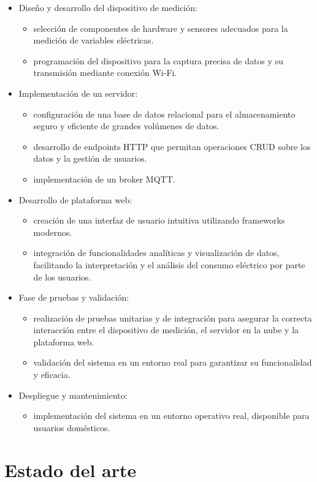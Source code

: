 \begin{itemize}
	\item Diseño y desarrollo del dispositivo de medición:
		\begin{itemize}
		\item selección de componentes de hardware y sensores adecuados para la medición de variables eléctricas.
		\item programación del dispositivo para la captura precisa de datos y su transmisión mediante conexión Wi-Fi.
		\end{itemize}
	\item Implementación de un servidor:
		\begin{itemize}
		\item configuración de una base de datos relacional para el almacenamiento seguro y eficiente de grandes volúmenes de datos.
		\item desarrollo de endpoints HTTP que permitan operaciones CRUD sobre los datos y la gestión de usuarios.
		\item implementación de un broker MQTT.
		\end{itemize}
	\item Desarrollo de plataforma web:
	\begin{itemize}
		\item creación de una interfaz de usuario intuitiva utilizando frameworks modernos.
		\item integración de funcionalidades analíticas y visualización de datos, facilitando la interpretación y el análisis del consumo eléctrico por parte de los usuarios.
	\end{itemize}
	\item Fase de pruebas y validación:
	\begin{itemize}
		\item realización de pruebas unitarias y de integración para asegurar la correcta interacción entre el dispositivo de medición, el servidor en la nube y la plataforma web.
		\item validación del sistema en un entorno real para garantizar su funcionalidad y eficacia.
	\end{itemize}
	\item Despliegue y mantenimiento:
	\begin{itemize}
		\item implementación del sistema en un entorno operativo real, disponible para usuarios domésticos.
	\end{itemize}
\end{itemize} 


\newpage

\section{Estado del arte}

